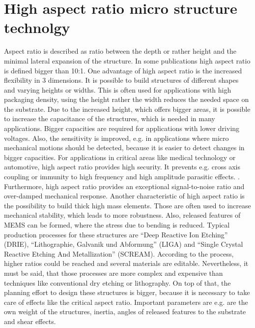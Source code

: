 \documentclass[a4paper,
  twoside, %
  headlines=2.1 %
  ]{scrartcl}
\begin{document}
\section{High aspect ratio micro structure technolgy}
Aspect ratio is described as ratio between the depth or rather height and the minimal lateral expansion of the structure. In some publications high aspect ratio is defined bigger than 10:1. \cite{mcnie2000} One advantage of high aspect ratio is the increased flexibility in 3 dimensions. It is possible to build structures of different shapes and varying heights or widths. This is often used for applications with high packaging density, using the height rather the width reduces the needed space on the substrate.\cite{mcnie2000} Due to the increased height, which offers bigger areas, it is possible to increase the capacitance of the structures, which is needed in many applications. Bigger capacities are required for applications with lower driving voltages. Also, the sensitivity is improved, e.g. in applications where micro mechanical motions should be detected, because it is easier to detect changes in bigger capacities. \cite{pang2001} For applications in critical areas like medical technology or automotive, high aspect ratio provides high security. It prevents e.g. cross axis coupling or immunity to high frequency and high amplitude parasitic effects. \cite{mcnie2000,NXP2009}. Furthermore, high aspect ratio provides an exceptional signal-to-noise ratio and over-damped mechanical response. \cite{NXP2009} Another characteristic of high aspect ratio is the possibility to build thick high mass elements. Those are often used to increase mechanical stability, which leads to more robustness. Also, released features of MEMS can be formed, where the stress due to bending is reduced. \cite{mcnie2000, pang2001, hutchison2010} Typical production processes for these structures are \enquote{Deep Reactive Ion Etching} (DRIE), \enquote{Lithographie, Galvanik und Abformung} (LIGA) and \enquote{Single Crystal Reactive Etching And Metallization} (SCREAM). According to the process, higher ratios could be reached and several materials are editable. Nevertheless, it must be said, that those processes are more complex and expensive than techniques like conventional dry etching or lithography. On top of that, the planning effort to design these structures is bigger, because it is necessary to take care of effects like the critical aspect ratio. Important parameters are e.g. are the own weight of the structures, inertia, angles of released features to the substrate and shear effects.
\end{document}
